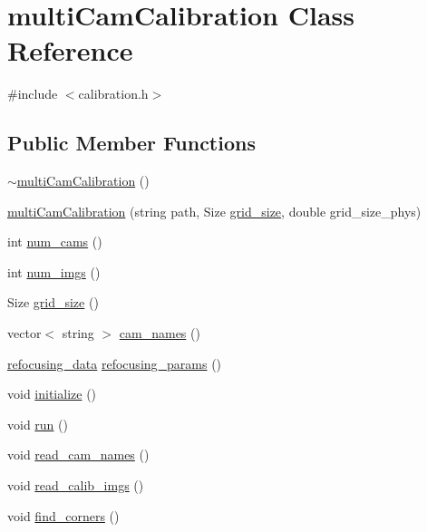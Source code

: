 \hypertarget{classmultiCamCalibration}{\section{multi\-Cam\-Calibration Class Reference}
\label{d7/d7b/classmultiCamCalibration}
}


{\ttfamily \#include $<$calibration.\-h$>$}

\subsection*{Public Member Functions}
\begin{DoxyCompactItemize}
\item 
\hyperlink{classmultiCamCalibration_a3ea94ec1303dc7b8fc35a195ba14a4d3}{$\sim$multi\-Cam\-Calibration} ()
\item 
\hyperlink{classmultiCamCalibration_a4dfba58ddb1abc222c287326da6fa03f}{multi\-Cam\-Calibration} (string path, Size \hyperlink{classmultiCamCalibration_a210c43ef7397dcf9b2c1c10c43a243e8}{grid\-\_\-size}, double grid\-\_\-size\-\_\-phys)
\item 
int \hyperlink{classmultiCamCalibration_a0672baa65e2c4f6f9457f05f33c55271}{num\-\_\-cams} ()
\item 
int \hyperlink{classmultiCamCalibration_a69f0c4582fa045cfcc7c146dbbea4078}{num\-\_\-imgs} ()
\item 
Size \hyperlink{classmultiCamCalibration_a210c43ef7397dcf9b2c1c10c43a243e8}{grid\-\_\-size} ()
\item 
vector$<$ string $>$ \hyperlink{classmultiCamCalibration_aec318f334898f58be8593ea7a9051dda}{cam\-\_\-names} ()
\item 
\hyperlink{structrefocusing__data}{refocusing\-\_\-data} \hyperlink{classmultiCamCalibration_a1591b01ff77ffb077f4b714239f61f55}{refocusing\-\_\-params} ()
\item 
void \hyperlink{classmultiCamCalibration_aaf34f70de1370d4a436cd44f0e5fa117}{initialize} ()
\item 
void \hyperlink{classmultiCamCalibration_aeee89100553583b0bd4570e94f2f505d}{run} ()
\item 
void \hyperlink{classmultiCamCalibration_a4aec5f46a3029784fd76e412308e65b5}{read\-\_\-cam\-\_\-names} ()
\item 
void \hyperlink{classmultiCamCalibration_aae9b08ca3712d652ae875df269db4cad}{read\-\_\-calib\-\_\-imgs} ()
\item 
void \hyperlink{classmultiCamCalibration_a311de3776df8af06bd7af56f9f9743f9}{find\-\_\-corners} ()

\end{DoxyCompactItemize}
